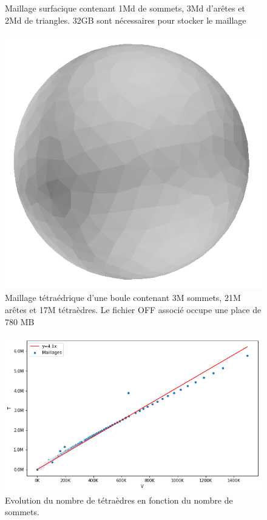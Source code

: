 \documentclass[9pt]{beamer}
\begin{document}
\begin{frame}
\begin{columns}[c]
\begin{column}[c]{.37\textwidth}
\begin{figure}
\caption{Maillage surfacique contenant 1Md de sommets, 3Md d'arêtes et 2Md de triangles. 32GB sont nécessaires pour stocker le maillage}
\vspace{-1em}
    \end{figure}
     \begin{figure}
    \includegraphics[scale=0.07]{Images/ball}
\caption{Maillage tétraédrique d'une boule contenant 3M sommets, 21M arêtes et 17M tétraèdres. Le fichier OFF associé occupe une place de 780 MB}
\vspace{-1em}
    \end{figure}
     \begin{figure}
    \includegraphics[scale=0.19]{Images/T_V_3D}
\caption{ Evolution du nombre de tétraèdres en fonction du nombre de sommets.}
    \end{figure}
    \end{column}%
  \end{columns}


\end{frame}
\end{document}
